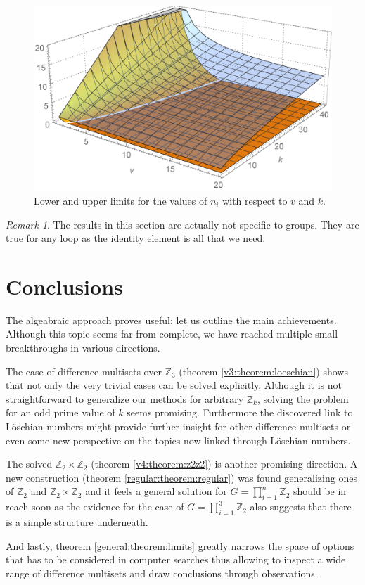 \documentclass{article}
\theoremstyle{plain}
\theoremstyle{definition}
\theoremstyle{remark}
\newtheorem{remark}[theorem]{Remark}
\begin{document}
		\begin{figure}
			\includegraphics[width=\textwidth]{boundingSurfaces}
			\caption{Lower and upper limits for the values of $n_i$ with respect to $v$ and $k$.}
			\label{general:figure:limits}
		\end{figure}
	
		\begin{remark}
			The results in this section are actually not specific to groups. They are true for any loop as the identity element is all that we need.
		\end{remark}
		
	\section{Conclusions}
		The algeabraic approach proves useful; let us outline the main achievements. Although this topic seems far from complete, we have reached multiple small breakthroughs in various directions.
		
		The case of difference multisets over $\mathbb Z_3$ (theorem \ref{v3:theorem:loeschian}) shows that not only the very trivial cases can be solved explicitly. Although it is not straightforward to generalize our methods for arbitrary $\mathbb Z_k$, solving the problem for an odd prime value of $k$ seems promising. Furthermore the discovered link to Löschian numbers might provide further insight for other difference multisets or even some new perspective on the topics now linked through Löschian numbers.
		
		The solved $\mathbb Z_2 \times \mathbb Z_2$ (theorem \ref{v4:theorem:z2z2}) is another promising direction. A new construction (theorem \ref{regular:theorem:regular}) was found generalizing ones of $\mathbb Z_2$ and $\mathbb Z_2 \times \mathbb Z_2$ and it feels a general solution for $G=\prod_{i=1}^{n} \mathbb Z_2$ should be in reach soon as the evidence for the case of $G=\prod_{i=1}^{3} \mathbb Z_2$ also suggests that there is a simple structure underneath.
		
		And lastly, theorem \ref{general:theorem:limits} greatly narrows the space of options that has to be considered in computer searches thus allowing to inspect a wide range of difference multisets and draw conclusions through observations.

	
	 
		
\end{document}
